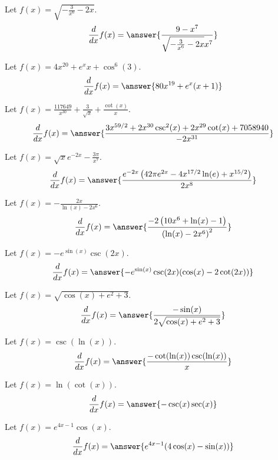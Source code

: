 \documentclass{ximera}
\begin{document}
\begin{shuffle}
\begin{exercise}
Let $f(x)=\sqrt{-\frac{3}{x^6}-2 x}$.
\[
\ddx f(x) = \answer{\frac{9-x^7}{\sqrt{-\frac{3}{x^6}-2 x} x^7}}
\]
\end{exercise}

\begin{exercise}
Let $f(x)=4 x^{20}+e^x x+\cos ^6(3)$.
\[
\ddx f(x) = \answer{80 x^{19}+e^x (x+1)}
\]
\end{exercise}

\begin{exercise}
Let $f(x)=\frac{117649}{x^{30}}+\frac{3}{\sqrt{x}}+\frac{\cot (x)}{x}$.
\[
\ddx f(x) = \answer{\frac{3 x^{59/2}+2 x^{30} \csc ^2(x)+2 x^{29} \cot (x)+7058940}{-2 x^{31}}}
\]
\end{exercise}

\begin{exercise}
Let $f(x)=\sqrt{x} e^{-2 x}-\frac{3 \pi }{x^7}$.
\[
\ddx f(x) = \answer{\frac{e^{-2 x} \left(42 \pi  e^{2 x}-4 x^{17/2} \ln (e)+x^{15/2}\right)}{2 x^8}}
\]
\end{exercise}

\begin{exercise}
Let $f(x)=-\frac{2 x}{\ln (x)-2 x^6}$.
\[
\ddx f(x) = \answer{\frac{-2 \left(10 x^6+\ln (x)-1\right)}{\left(\ln (x)-2 x^6\right)^2}}
\]
\end{exercise}

\begin{exercise}
Let $f(x)=-e^{\sin (x)} \csc (2 x)$.
\[
\ddx f(x) = \answer{-e^{\sin (x)} \csc (2 x) (\cos (x)-2 \cot (2 x))}
\]
\end{exercise}

\begin{exercise}
Let $f(x)=\sqrt{\cos (x)+e^2+3}$.
\[
\ddx f(x) = \answer{\frac{-\sin (x)}{2 \sqrt{\cos (x)+e^2+3}}}
\]
\end{exercise}

\begin{exercise}
Let $f(x)=\csc (\ln (x))$.
\[
\ddx f(x) = \answer{\frac{-\cot (\ln (x)) \csc (\ln (x))}{x}}
\]
\end{exercise}

\begin{exercise}
Let $f(x)=\ln (\cot (x))$.
\[
\ddx f(x) = \answer{-\csc (x) \sec (x)}
\]
\end{exercise}

\begin{exercise}
Let $f(x)=e^{4 x-1} \cos (x)$.
\[
\ddx f(x) = \answer{e^{4 x-1} (4 \cos (x)-\sin (x))}
\]
\end{exercise}


\end{shuffle}
\end{document}
